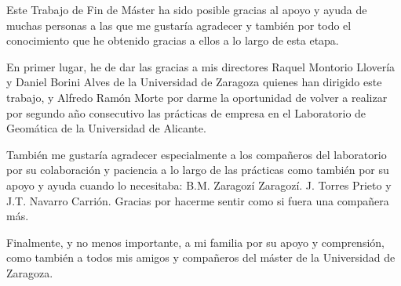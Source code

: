 
\begin{acknowledgements}      

Este Trabajo de Fin de Máster ha sido posible gracias al apoyo y ayuda de muchas personas a las que me gustaría agradecer y también por todo el conocimiento que he obtenido gracias a ellos a lo largo de esta etapa.

En primer lugar, he de dar las gracias a mis directores Raquel Montorio Llovería y Daniel Borini Alves de la Universidad de Zaragoza quienes han dirigido este trabajo, y Alfredo Ramón Morte por darme la oportunidad de volver a realizar por segundo año consecutivo las prácticas de empresa en el Laboratorio de Geomática de la Universidad de Alicante.

También me gustaría agradecer especialmente a los compañeros del laboratorio por su colaboración y paciencia a lo largo de las prácticas como también por su apoyo y ayuda cuando lo necesitaba: B.M. Zaragozí Zaragozí. J. Torres Prieto y J.T. Navarro Carrión. Gracias por hacerme sentir como si fuera una compañera más.

Finalmente, y no menos importante, a mi familia por su apoyo y comprensión, como también a todos mis amigos y compañeros del máster de la Universidad de Zaragoza.

\end{acknowledgements}
